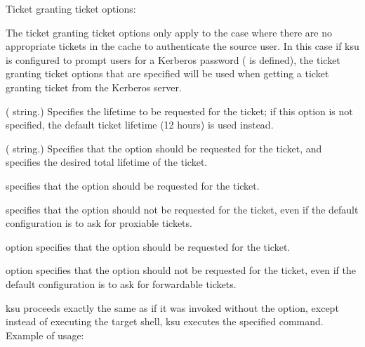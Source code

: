 \documentclass[letterpaper,10pt,english]{sphinxmanual}
\begin{document}
\sphinxAtStartPar
Ticket granting ticket options:
\begin{description}
\sphinxAtStartPar
The ticket granting ticket options only apply to the case where
there are no appropriate tickets in the cache to authenticate the
source user.  In this case if ksu is configured to prompt users
for a Kerberos password ( is defined), the
ticket granting ticket options that are specified will be used
when getting a ticket granting ticket from the Kerberos server.

\sphinxAtStartPar
( string.)  Specifies the lifetime to be requested
for the ticket; if this option is not specified, the default ticket
lifetime (12 hours) is used instead.

\sphinxAtStartPar
( string.)  Specifies that the  option
should be requested for the ticket, and specifies the desired
total lifetime of the ticket.

\sphinxAtStartPar
specifies that the  option should be requested for
the ticket.

\sphinxAtStartPar
specifies that the  option should not be requested
for the ticket, even if the default configuration is to ask for
proxiable tickets.

\sphinxAtStartPar
option specifies that the  option should be
requested for the ticket.

\sphinxAtStartPar
option specifies that the  option should not be
requested for the ticket, even if the default configuration is to
ask for forwardable tickets.

\sphinxAtStartPar
ksu proceeds exactly the same as if it was invoked without the
 option, except instead of executing the target shell, ksu
executes the specified command. Example of usage:


\end{description}
\end{document}
